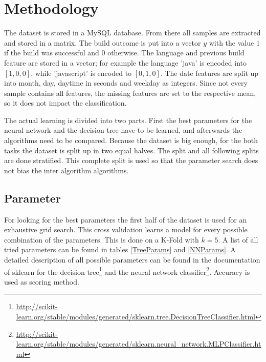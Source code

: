 \documentclass[a4paper,11pt]{article}
\begin{document}

\section{Methodology}

The dataset is stored in a MySQL database. From there all samples are extracted and stored in a matrix. The build outcome is put into a vector $y$ with the value $1$ if the build was successful and $0$ otherwise. The language and previous build feature are stored in a vector; for example the language 'java' is encoded into $[1,0,0]$, while 'javascript' is encoded to $[0,1,0]$. The date features are split up into month, day, daytime in seconds and weekday as integers. 
Since not every sample contains all features, the missing features are set to the respective mean, so it does not impact the classification.

The actual learning is divided into two parts. First the best parameters for the neural network and the decision tree have to be learned, and afterwards the algorithms need to be compared. Because the dataset is big enough, for the both tasks the dataset is split up in two equal halves. The split and all following splits are done stratified. This complete split is used so that the parameter search does not bias the inter algorithm algorithms. 



\subsection{Parameter}

For looking for the best parameters the first half of the dataset is used for an exhaustive grid search. This cross validation learns a model for every possible combination of the parameters. This is done on a K-Fold with $k=5$. A list of all tried parameters can be found in tables \ref{TreeParams} and \ref{NNParams}. 
A detailed description of all possible parameters can be found in the documentation of sklearn for the decision tree\footnote{\url{http://scikit-learn.org/stable/modules/generated/sklearn.tree.DecisionTreeClassifier.html}} and the neural network classifier\footnote{\url{http://scikit-learn.org/stable/modules/generated/sklearn.neural_network.MLPClassifier.html}}. 
Accuracy is used as scoring method. 

\end{document}
